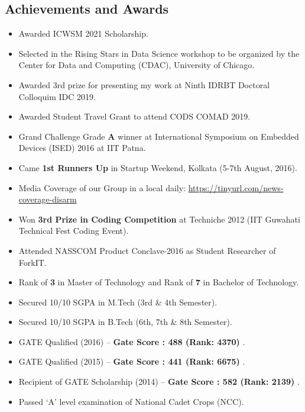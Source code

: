 \documentclass[margin, centered]{res}
\begin{document}
\begin{resume}
\section{Achievements and Awards}
\begin{itemize}[leftmargin=*]
 \item Awarded ICWSM 2021 Scholarship.
 \item Selected in the Rising Stars in Data Science workshop to be organized by the Center for Data and Computing (CDAC), University of Chicago.
 \item Awarded 3rd prize for presenting my work at Ninth IDRBT Doctoral Colloquim IDC 2019.
 \item Awarded Student Travel Grant to attend CODS COMAD 2019.
 \item Grand Challenge Grade \textbf{A} winner at International Symposium on Embedded Devices (ISED) 2016 at IIT Patna.
 \item Came \textbf{1st Runners Up} in Startup Weekend, Kolkata (5-7th August, 2016).
 \item Media Coverage of our Group in a local daily: \url{https://tinyurl.com/news-coverage-disarm}
 \item Won \textbf{3rd Prize in Coding Competition} at Techniche 2012 (IIT Guwahati Technical Fest Coding Event).
 \item Attended NASSCOM Product Conclave-2016 as Student Researcher of ForkIT.
 \item Rank of \textbf{3} in Master of Technology and Rank of \textbf{7} in Bachelor of Technology.
 \item Secured 10/10 SGPA in M.Tech (3rd \& 4th Semester).
 \item Secured 10/10 SGPA in B.Tech (6th, 7th \& 8th Semester).
 \item GATE Qualified (2016) – \textbf{Gate Score : 488 (Rank: 4370) }.
 \item GATE Qualified (2015) – \textbf{Gate Score : 441 (Rank: 6675) }.
 \item Recipient of GATE Scholarship (2014) – \textbf{Gate Score : 582 (Rank: 2139) }.

 \item Passed `A' level examination of National Cadet Crops (NCC).
\end{itemize}


\end{resume}
\end{document}
